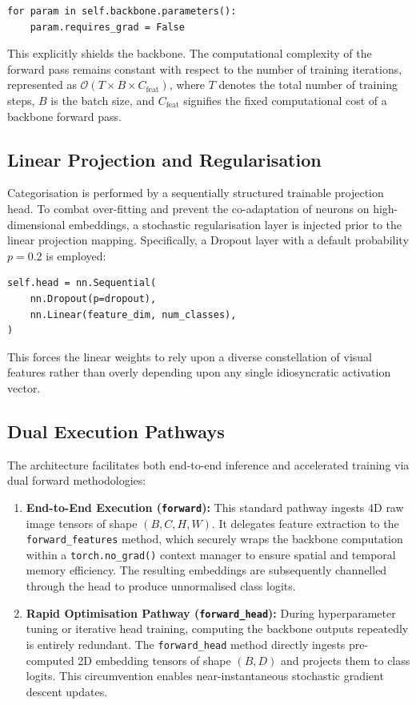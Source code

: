 \begin{verbatim}
for param in self.backbone.parameters():
    param.requires_grad = False
\end{verbatim}

This explicitly shields the backbone. The computational complexity of the forward pass remains constant with respect to the number of training iterations, represented as $\mathcal{O}(T \times B \times C_{\text{feat}})$, where $T$ denotes the total number of training steps, $B$ is the batch size, and $C_{\text{feat}}$ signifies the fixed computational cost of a backbone forward pass.

\subsection{Linear Projection and Regularisation}

Categorisation is performed by a sequentially structured trainable projection head. To combat over-fitting and prevent the co-adaptation of neurons on high-dimensional embeddings, a stochastic regularisation layer is injected prior to the linear projection mapping. Specifically, a Dropout layer with a default probability $p=0.2$ is employed:

\begin{verbatim}
self.head = nn.Sequential(
    nn.Dropout(p=dropout),
    nn.Linear(feature_dim, num_classes),
)
\end{verbatim}

This forces the linear weights to rely upon a diverse constellation of visual features rather than overly depending upon any single idiosyncratic activation vector.

\subsection{Dual Execution Pathways}

The architecture facilitates both end-to-end inference and accelerated training via dual forward methodologies:

\begin{enumerate}
    \item \textbf{End-to-End Execution (\texttt{forward}):} This standard pathway ingests 4D raw image tensors of shape $(B, C, H, W)$. It delegates feature extraction to the \texttt{forward\_features} method, which securely wraps the backbone computation within a \texttt{torch.no\_grad()} context manager to ensure spatial and temporal memory efficiency. The resulting embeddings are subsequently channelled through the head to produce unnormalised class logits.
    \item \textbf{Rapid Optimisation Pathway (\texttt{forward\_head}):} During hyperparameter tuning or iterative head training, computing the backbone outputs repeatedly is entirely redundant. The \texttt{forward\_head} method directly ingests pre-computed 2D embedding tensors of shape $(B, D)$ and projects them to class logits. This circumvention enables near-instantaneous stochastic gradient descent updates.
\end{enumerate}

